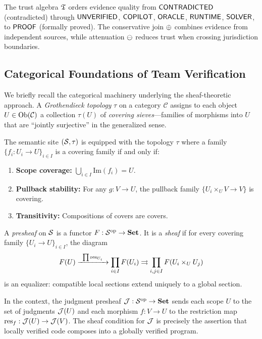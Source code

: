 \documentclass[11pt]{article}
\newcommand{\op}{\mathrm{op}}
\newcommand{\Set}{\mathbf{Set}}
\begin{document}
The trust algebra $\mathfrak{T}$ orders evidence quality from $\mathsf{CONTRADICTED}$ (contradicted)
through $\mathsf{UNVERIFIED}$, $\mathsf{COPILOT}$, $\mathsf{ORACLE}$, $\mathsf{RUNTIME}$, $\mathsf{SOLVER}$, to
$\mathsf{PROOF}$ (formally proved). The conservative join $\oplus$ combines evidence
from independent sources, while attenuation $\ominus$ reduces trust when
crossing jurisdiction boundaries.

\subsection{Categorical Foundations of Team Verification}\label{sec:cat-foundations}

We briefly recall the categorical machinery underlying the sheaf-theoretic
approach. A \emph{Grothendieck topology} $\tau$ on a category $\mathcal{C}$
assigns to each object $U \in \mathrm{Ob}(\mathcal{C})$ a collection
$\tau(U)$ of \emph{covering sieves}---families of morphisms into $U$ that are
``jointly surjective'' in the generalized sense.

\begin{definition}
The semantic site $(\mathcal{S}, \tau)$ is equipped with the topology $\tau$ where a
family $\{f_i : U_i \to U\}_{i \in I}$ is a covering family if and only if:
\begin{enumerate}
  \item \textbf{Scope coverage:} $\bigcup_{i \in I} \mathrm{Im}(f_i) = U$.
  \item \textbf{Pullback stability:} For any $g : V \to U$, the pullback
        family $\{U_i \times_U V \to V\}$ is covering.
  \item \textbf{Transitivity:} Compositions of covers are covers.
\end{enumerate}
\end{definition}

\begin{definition}
A \emph{presheaf} on $\mathcal{S}$ is a functor $F : \Site^{\op} \to \Set$. It is a
\emph{sheaf} if for every covering family $\{U_i \to U\}_{i \in I}$, the
diagram
\[
  F(U) \xrightarrow{\;\;\prod \mathrm{res}_{U_i}\;\;}
  \prod_{i \in I} F(U_i)
  \rightrightarrows
  \prod_{i,j \in I} F(U_i \times_U U_j)
\]
is an equalizer: compatible local sections extend uniquely to a global section.
\end{definition}

In the \JuGeo{} context, the judgment presheaf $\J : \Site^{\op} \to \Set$ sends
each scope $U$ to the set of judgments $\mathcal{J}(U)$ and each morphism
$f : V \to U$ to the restriction map $\mathrm{res}_f : \mathcal{J}(U) \to \mathcal{J}(V)$. The sheaf
condition for $\mathcal{J}$ is precisely the assertion that locally verified code
composes into a globally verified program.
\end{document}
